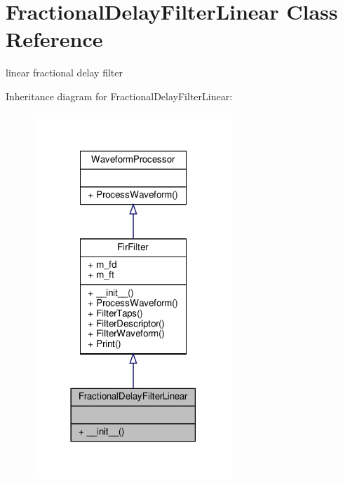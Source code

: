 \hypertarget{classSignalIntegrity_1_1TimeDomain_1_1Filters_1_1InterpolatorLinear_1_1FractionalDelayFilterLinear}{}\section{Fractional\+Delay\+Filter\+Linear Class Reference}
\label{classSignalIntegrity_1_1TimeDomain_1_1Filters_1_1InterpolatorLinear_1_1FractionalDelayFilterLinear}


linear fractional delay filter  




Inheritance diagram for Fractional\+Delay\+Filter\+Linear\+:
\nopagebreak
\begin{figure}[H]
\begin{center}
\leavevmode
\includegraphics[width=213pt]{classSignalIntegrity_1_1TimeDomain_1_1Filters_1_1InterpolatorLinear_1_1FractionalDelayFilterLinear__inherit__graph}
\end{center}
\end{figure}


